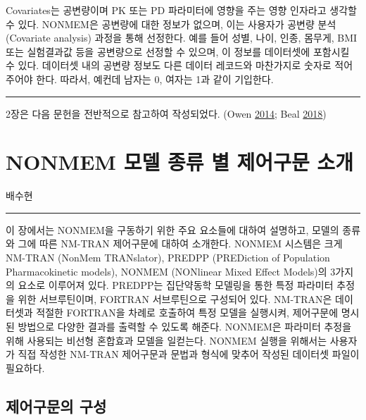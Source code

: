 \documentclass[
  11pt,
  krantz2, a4paper, twoside]{krantz}
\theoremstyle{definition}
\theoremstyle{definition}
\theoremstyle{definition}
\theoremstyle{remark}
\begin{document}
Covariates는 공변량이며 PK 또는 PD 파라미터에 영향을 주는 영향 인자라고 생각할 수 있다. NONMEM은 공변량에 대한 정보가 없으며, 이는 사용자가 공변량 분석(Covariate analysis) 과정을 통해 선정한다. 예를 들어 성별, 나이, 인종, 몸무게, BMI 또는 실험결과값 등을 공변량으로 선정할 수 있으며, 이 정보를 데이터셋에 포함시킬 수 있다. 데이터셋 내의 공변량 정보도 다른 데이터 레코드와 마찬가지로 숫자로 적어주어야 한다. 따라서, 예컨데 남자는 0, 여자는 1과 같이 기입한다.

\begin{center}\rule{0.5\linewidth}{0.5pt}\end{center}

2장은 다음 문헌을 전반적으로 참고하여 작성되었다. (Owen \protect\hyperlink{ref-kelly}{2014}; Beal \protect\hyperlink{ref-nonmem}{2018})

\hypertarget{control-stream}{%
\chapter{NONMEM 모델 종류 별 제어구문 소개}\label{control-stream}}

\Large\hfill

배수현
\normalsize

\begin{center}\rule{0.5\linewidth}{0.5pt}\end{center}

이 장에서는 NONMEM을 구동하기 위한 주요 요소들에 대하여 설명하고, 모델의 종류와 그에 따른 NM-TRAN 제어구문에 대하여 소개한다. NONMEM 시스템은 크게 NM-TRAN (NonMem TRANslator), PREDPP (PREDiction of Population Pharmacokinetic models), NONMEM (NONlinear Mixed Effect Models)의 3가지의 요소로 이루어져 있다. PREDPP는 집단약동학 모델링을 통한 특정 파라미터 추정을 위한 서브루틴이며, FORTRAN 서브루틴으로 구성되어 있다. NM-TRAN은 데이터셋과 적절한 FORTRAN을 차례로 호출하여 특정 모델을 실행시켜, 제어구문에 명시된 방법으로 다양한 결과를 출력할 수 있도록 해준다. NONMEM은 파라미터 추정을 위해 사용되는 비선형 혼합효과 모델을 일컫는다. NONMEM 실행을 위해서는 사용자가 직접 작성한 NM-TRAN 제어구문과 문법과 형식에 맞추어 작성된 데이터셋 파일이 필요하다.

\hypertarget{uxc81cuxc5b4uxad6cuxbb38uxc758-uxad6cuxc131}{%
\section{제어구문의 구성}\label{uxc81cuxc5b4uxad6cuxbb38uxc758-uxad6cuxc131}}
\end{document}
